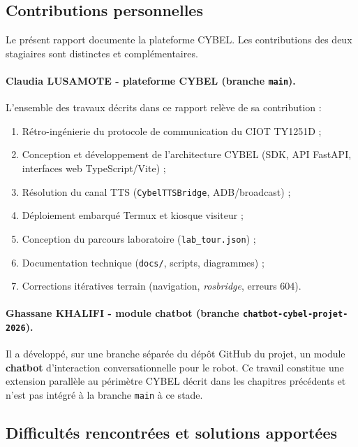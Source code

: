 \subsection{Contributions personnelles}

Le présent rapport documente la plateforme CYBEL. Les contributions des deux
stagiaires sont distinctes et complémentaires.

\paragraph{Claudia LUSAMOTE - plateforme CYBEL (branche \texttt{main}).}

L'ensemble des travaux décrits dans ce rapport relève de sa contribution :
\begin{enumerate}
    \item Rétro-ingénierie du protocole de communication du CIOT TY1251D ;
    \item Conception et développement de l'architecture CYBEL (SDK, API FastAPI,
    interfaces web TypeScript/Vite) ;
    \item Résolution du canal TTS (\texttt{CybelTTSBridge}, ADB/broadcast) ;
    \item Déploiement embarqué Termux et kiosque visiteur ;
    \item Conception du parcours laboratoire (\texttt{lab\_tour.json}) ;
    \item Documentation technique (\texttt{docs/}, scripts, diagrammes) ;
    \item Corrections itératives terrain (navigation, \textit{rosbridge}, erreurs 604).
\end{enumerate}

\paragraph{Ghassane KHALIFI - module chatbot (branche \texttt{chatbot-cybel-projet-2026}).}
Il a développé, sur une branche séparée du dépôt GitHub du projet, un module
\textbf{chatbot} d'interaction conversationnelle pour le robot. Ce travail
constitue une extension parallèle au périmètre CYBEL décrit dans les chapitres
précédents et n'est pas intégré à la branche \texttt{main} à ce stade.


\subsection{Difficultés rencontrées et solutions apportées}

